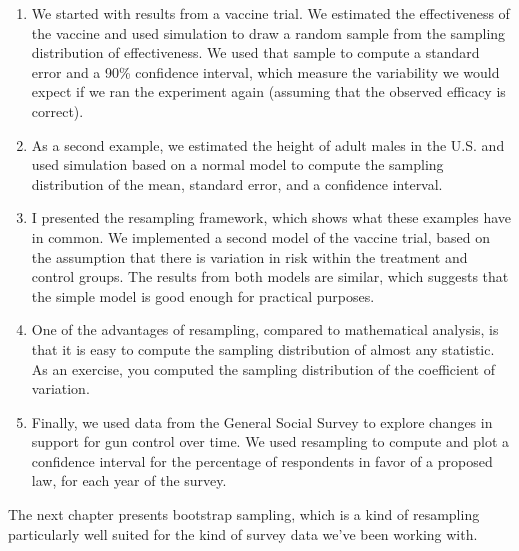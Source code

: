 \begin{enumerate}
\def\labelenumi{\arabic{enumi}.}
\item
  We started with results from a vaccine trial. We estimated the
  effectiveness of the vaccine and used simulation to draw a random
  sample from the sampling distribution of effectiveness. We used that
  sample to compute a standard error and a 90\% confidence interval,
  which measure the variability we would expect if we ran the experiment
  again (assuming that the observed efficacy is correct).
\item
  As a second example, we estimated the height of adult males in the
  U.S. and used simulation based on a normal model to compute the
  sampling distribution of the mean, standard error, and a confidence
  interval.
\item
  I presented the resampling framework, which shows what these examples
  have in common. We implemented a second model of the vaccine trial,
  based on the assumption that there is variation in risk within the
  treatment and control groups. The results from both models are
  similar, which suggests that the simple model is good enough for
  practical purposes.
\item
  One of the advantages of resampling, compared to mathematical
  analysis, is that it is easy to compute the sampling distribution of
  almost any statistic. As an exercise, you computed the sampling
  distribution of the coefficient of variation.
\item
  Finally, we used data from the General Social Survey to explore
  changes in support for gun control over time. We used resampling to
  compute and plot a confidence interval for the percentage of
  respondents in favor of a proposed law, for each year of the survey.
\end{enumerate}

The next chapter presents bootstrap sampling, which is a kind of
resampling particularly well suited for the kind of survey data we've
been working with.


